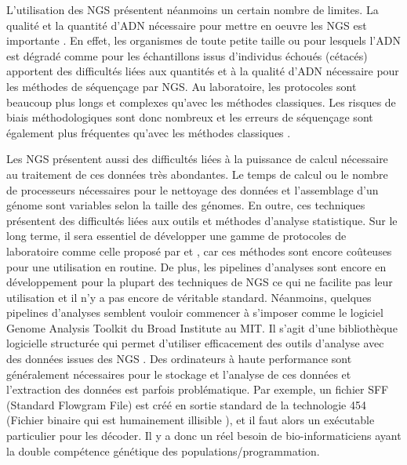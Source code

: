 \documentclass[a4paper,12pt,twoside]{article}\usepackage[]{graphicx}\usepackage[]{color}
\begin{document}
\begin {bibunit} [newbst]
\begin{enca}
{}



		
\end{enca}

L'utilisation des NGS présentent néanmoins un certain nombre de limites. La qualité et la quantité d'ADN nécessaire pour mettre en oeuvre les NGS est importante \cite{davey2011genome}. En effet, les organismes de toute petite taille \citep{baily1992detection} ou pour lesquels l'ADN est dégradé comme pour les échantillons issus d'individus échoués (cétacés) \citep{taberlet2012towards, templeton2013dna} apportent des difficultés liées aux quantités et à la qualité d'ADN nécessaire pour les méthodes de séquençage par NGS. Au laboratoire, les protocoles sont beaucoup plus longs et complexes qu'avec les méthodes classiques. Les risques de biais méthodologiques sont donc nombreux \citep[voir par exemple][]{bonin2004aa, baird2008aa, peterson2012double, hohenlohe2012extensive, niu2010artificial, gomez2009systematic,haas2011chimeric} et les erreurs de séquençage sont également plus fréquentes qu'avec les méthodes classiques \citep{mastretta2015restriction, shendure2008next}.

Les NGS présentent aussi des difficultés liées à la puissance de calcul nécessaire au traitement de ces données très abondantes. Le temps de calcul ou le nombre de processeurs nécessaires pour le nettoyage des données et l'assemblage d'un génome sont variables selon la taille des génomes. En outre, ces techniques présentent des difficultés liées aux outils et méthodes d'analyse statistique.  Sur le long terme, il sera essentiel de développer une gamme de protocoles de laboratoire comme celle proposé par \citet{zielinski2014development} et \citet{lighten2014aa}, car ces méthodes sont encore coûteuses pour une utilisation en routine. De plus, les pipelines d'analyses sont encore en développement pour la plupart des techniques de NGS \citep{lighten2014aa} ce qui ne facilite pas leur utilisation et il n'y a pas encore de véritable standard. Néanmoins, quelques pipelines d'analyses semblent vouloir commencer à s'imposer comme le logiciel Genome Analysis Toolkit du Broad Institute au MIT. Il s'agit d'une bibliothèque logicielle structurée qui permet d'utiliser efficacement des outils d'analyse avec des données issues des NGS \citep{lam2012detecting}. Des ordinateurs à haute performance sont généralement nécessaires pour le stockage et l'analyse de ces données \citep{shafer2015genomics, garner2015genomics} et l'extraction des données est parfois problématique. Par exemple, un fichier SFF (Standard Flowgram File) est créé en sortie standard de la technologie 454 (Fichier binaire qui est humainement illisible \citealp{peyretaillade2011extreme}), et il faut alors un exécutable particulier pour les décoder. Il y a donc un réel besoin de bio-informaticiens ayant la double compétence génétique des populations/programmation.


\end{bibunit}
\end{document}
